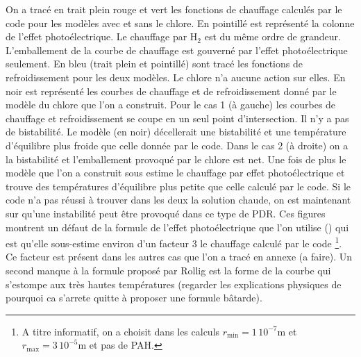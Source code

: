 On a tracé en trait plein rouge et vert les fonctions de chauffage calculés par le code pour les modèles avec et sans le chlore. En pointillé est représenté la colonne de l'effet photoélectrique. Le chauffage par $\mathrm{H}_2$ est du même ordre de grandeur. L'emballement de la courbe de chauffage est gouverné par l'effet photoélectrique seulement. En bleu (trait plein et pointillé) sont tracé les fonctions de refroidissement pour les deux modèles. Le chlore n'a aucune action sur elles. En noir est représenté les courbes de chauffage et de refroidissement donné par le modèle du chlore que l'on a construit. \newline 
Pour le cas 1 (à gauche) les courbes de chauffage et refroidissement se coupe en un seul point d'intersection. Il n'y a pas de bistabilité. Le modèle (en noir) décellerait une bistabilité et une température d'équilibre plus froide que celle donnée par le code. Dans le cas 2 (à droite) on a la bistabilité et l'emballement provoqué par le chlore est net. Une fois de plus le modèle que l'on a construit sous estime le chauffage par effet photoélectrique et trouve des températures d'équilibre plus petite que celle calculé par le code. Si le code n'a pas réussi à trouver dans les deux la solution chaude, on est maintenant sur qu'une instabilité peut être provoqué dans ce type de PDR. Ces figures montrent un défaut de la formule de l'effet photoélectrique que l'on utilise (\cite{Rollig2005}) qui est qu'elle sous-estime environ d'un facteur 3 le chauffage calculé par le code \footnote{A titre informatif, on a choisit dans les calculs $r_\mathrm{min} = 1\,10^{-7} \mathrm{m}$ et $r_\mathrm{max} = 3\,10^{-5} \mathrm{m}$ et pas de PAH.}. Ce facteur est présent dans les autres cas que l'on a tracé en annexe (a faire). Un second manque à la formule proposé par Rollig est la forme de la courbe qui s'estompe aux très hautes températures (regarder les explications physiques de pourquoi ca s'arrete quitte à proposer une formule bâtarde). 

